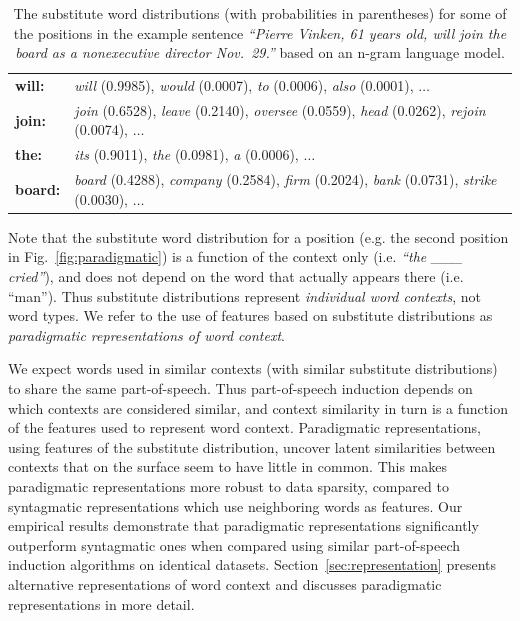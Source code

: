 \begin{table}[h]
\caption{The substitute word distributions (with probabilities in
  parentheses) for some of the positions in the example sentence
  \textit{``Pierre Vinken, 61 years old, will join the board as a
    nonexecutive director Nov.~29.''} based on an n-gram language
  model.}
\label{tab:subdist}
\begin{tabular}{|ll|} \hline
\textbf{will:} & \textit{will} (0.9985), \textit{would} (0.0007), \textit{to} (0.0006), \textit{also} (0.0001), $\ldots$ \\
\textbf{join:} & \textit{join} (0.6528), \textit{leave} (0.2140), \textit{oversee} (0.0559), \textit{head} (0.0262), \textit{rejoin} (0.0074), $\ldots$ \\
\textbf{the:}  &\textit{its} (0.9011), \textit{the} (0.0981), \textit{a} (0.0006), $\ldots$ \\
\textbf{board:} & \textit{board} (0.4288), \textit{company} (0.2584), \textit{firm} (0.2024), \textit{bank} (0.0731), \textit{strike} (0.0030), $\ldots$ \\
\hline
\end{tabular}
\end{table}

Note that the substitute word distribution for a position (e.g. the
second position in Fig.~\ref{fig:paradigmatic}) is a function of the
context only (i.e. \textit{``the \_\_\_ cried''}), and does not depend
on the word that actually appears there (i.e. ``man'').  Thus
substitute distributions represent {\em individual word contexts}, not
word types.  We refer to the use of features based on substitute
distributions as {\em paradigmatic representations of word context}.

We expect words used in similar contexts (with similar substitute
distributions) to share the same part-of-speech.  Thus part-of-speech
induction depends on which contexts are considered similar, and
context similarity in turn is a function of the features used to
represent word context.  Paradigmatic representations, using features
of the substitute distribution, uncover latent similarities between
contexts that on the surface seem to have little in common.  This
makes paradigmatic representations more robust to data sparsity,
compared to syntagmatic representations which use neighboring words as
features.  Our empirical results demonstrate that paradigmatic
representations significantly outperform syntagmatic ones when
compared using similar part-of-speech induction algorithms on
identical datasets.  Section~\ref{sec:representation} presents
alternative representations of word context and discusses paradigmatic
representations in more detail.

